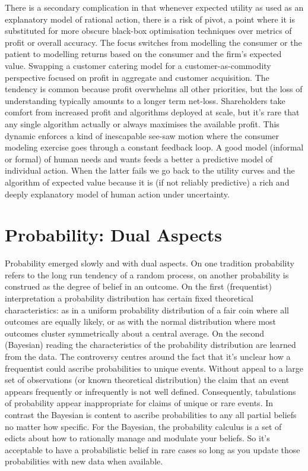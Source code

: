 \documentclass[]{tufte-book}
\theoremstyle{definition}
\theoremstyle{definition}
\theoremstyle{definition}
\theoremstyle{remark}
\begin{document}
There is a secondary complication in that whenever expected utility as used as an explanatory model of rational action, there is a risk of pivot, a point where it is substituted for more obscure black-box optimisation techniques over metrics of profit or overall accuracy. The focus switches from modelling the consumer or the patient to modelling returns based on the consumer and the firm's expected value. Swapping a customer catering model for a customer-as-commodity perspective focused on profit in aggregate and customer acquisition. The tendency is common because profit overwhelms all other priorities, but the loss of understanding typically amounts to a longer term net-loss. Shareholders take comfort from increased profit and algorithms deployed at scale, but it's rare that any single algorithm actually or always maximises the available profit. This dynamic enforces a kind of inescapable see-saw motion where the consumer modeling exercise goes through a constant feedback loop. A good model (informal or formal) of human needs and wants feeds a better a predictive model of individual action. When the latter fails we go back to the utility curves and the algorithm of expected value because it is (if not reliably predictive) a rich and deeply explanatory model of human action under uncertainty.

\hypertarget{probability-dual-aspects}{%
\section{Probability: Dual Aspects}\label{probability-dual-aspects}}

Probability emerged slowly and with dual aspects. On one tradition probability refers to the long run tendency of a random process, on another probability is construed as the degree of belief in an outcome. On the first (frequentist) interpretation a probability distribution has certain fixed theoretical characteristics: as in a uniform probability distribution of a fair coin where all outcomes are equally likely, or as with the normal distribution where most outcomes cluster symmetrically about a central average. On the second (Bayesian) reading the characteristics of the probability distribution are learned from the data. The controversy centres around the fact that it's unclear how a frequentist could ascribe probabilities to unique events. Without appeal to a large set of observations (or known theoretical distribution) the claim that an event appears frequently or infrequently is not well defined. Consequently, tabulations of probability appear inappropriate for claims of unique or rare events. In contrast the Bayesian is content to ascribe probabilities to any all partial beliefs no matter how specific. For the Bayesian, the probability calculus is a set of edicts about how to rationally manage and modulate your beliefs. So it's acceptable to have a probabilistic belief in rare cases so long as you update those probabilities with new data when available.
\end{document}
